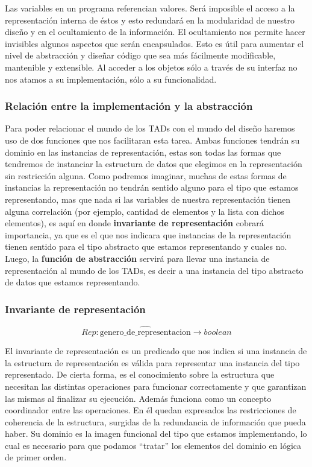 Las variables en un programa referencian valores. Ser\'a imposible el acceso a la representaci\'on interna de \'estos y esto redundar\'a en la modularidad de nuestro dise\~no y en el ocultamiento de la informaci\'on. El ocultamiento nos permite hacer invisibles algunos aspectos que ser\'an encapsulados. Esto es \'util para aumentar el nivel de abstracci\'on y dise\~nar c\'odigo que sea m\'as f\'acilmente modificable, mantenible y extensible. Al acceder a los objetos s\'olo a trav\'es de su interfaz no nos atamos a su implementaci\'on, s\'olo a su funcionalidad.

\subsubsection{Relaci\'on entre la implementaci\'on y la abstracci\'on}

Para poder relacionar el mundo de los TADs con el mundo del dise\~no haremos uso de dos funciones que nos facilitaran esta tarea. Ambas funciones tendr\'an su dominio en las instancias de representaci\'on, estas son todas las formas que tendremos de instanciar la estructura de datos que elegimos en la representaci\'on sin restricci\'on alguna. Como podremos imaginar, muchas de estas formas de instancias la representaci\'on no tendr\'an sentido alguno para el tipo que estamos representando, mas que nada si las variables de nuestra representaci\'on tienen alguna correlaci\'on (por ejemplo, cantidad de elementos y la lista con dichos elementos), es aqu\'i en donde \textbf{invariante de representaci\'on} cobrar\'a importancia, ya que es el que nos indicara que instancias de la representaci\'on tienen sentido para el tipo abstracto que estamos representando y cuales no. Luego, la \textbf{funci\'on de abstracci\'on} servir\'a para llevar una instancia de representaci\'on al mundo de los TADs, es decir a una instancia del tipo abstracto de datos que estamos representando.

\subsubsection{Invariante de representaci\'on}

\begin{equation*}
Rep: \widehat{\text{genero\_de\_representacion}} \rightarrow boolean
\end{equation*}

El invariante de representaci\'on es un predicado que nos indica si una instancia de la estructura de representaci\'on es v\'alida para representar una instancia del tipo representado. De cierta forma, es el conocimiento sobre la estructura que necesitan las distintas operaciones para funcionar correctamente y que garantizan las mismas al finalizar su ejecuci\'on. Adem\'as funciona como un concepto coordinador entre las operaciones. En \'el quedan expresados las restricciones de coherencia de la estructura, surgidas de la redundancia de informaci\'on que pueda haber.
Su dominio es la imagen funcional del tipo que estamos implementando, lo cual es necesario para que podamos ``tratar'' los elementos del dominio en l\'ogica de primer orden.

